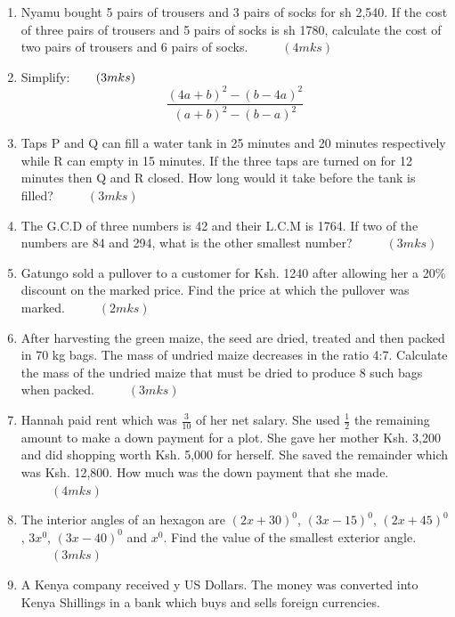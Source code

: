 \documentclass[
  a4paperpaper,
]{scrbook}
\begin{document}
\begin{tcolorbox}
\begin{enumerate}
\def\labelenumi{\arabic{enumi}.}
\setcounter{enumi}{1}
\item
  Nyamu bought 5 pairs of trousers and 3 pairs of socks for sh 2,540. If
  the cost of three pairs of trousers and 5 pairs of socks is sh 1780,
  calculate the cost of two pairs of trousers and 6 pairs of socks.
  \(\hspace{1cm} (4mks)\)
\item
  Simplify: \(\hspace{0.6cm} (3mks)\)
  \[ \frac{(4a+b)^2-(b-4a)^2}{(a+b)^2-(b-a)^2}\]
\item
  Taps P and Q can fill a water tank in 25 minutes and 20 minutes
  respectively while R can empty in 15 minutes. If the three taps are
  turned on for 12 minutes then Q and R closed. How long would it take
  before the tank is filled? \(\hspace{1cm} (3 mks)\)
\item
  The G.C.D of three numbers is 42 and their L.C.M is 1764. If two of
  the numbers are 84 and 294, what is the other smallest number?
  \(\hspace{1cm} (3 mks)\)
\item
  Gatungo sold a pullover to a customer for Ksh. 1240 after allowing her
  a 20\% discount on the marked price. Find the price at which the
  pullover was marked. \(\hspace{1cm}(2mks)\)
\item
  After harvesting the green maize, the seed are dried, treated and then
  packed in 70 kg bags. The mass of undried maize decreases in the ratio
  4:7. Calculate the mass of the undried maize that must be dried to
  produce 8 such bags when packed. \(\hspace{1cm}(3mks)\)
\item
  Hannah paid rent which was \(\frac{3}{10}\) of her net salary. She
  used \(\frac{1}{2}\) the remaining amount to make a down payment for a
  plot. She gave her mother Ksh. 3,200 and did shopping worth Ksh. 5,000
  for herself. She saved the remainder which was Ksh. 12,800. How much
  was the down payment that she made. \(\hspace{1cm} (4mks)\)
\item
  The interior angles of an hexagon are \((2x + 30)^0\),
  \((3x - 15)^0\), \((2x + 45)^0\), \(3x^0\), \((3x - 40)^0\) and
  \(x^0\). Find the value of the smallest exterior angle.
  \(\hspace{1cm} (3mks)\)
\item
  A Kenya company received y US Dollars. The money was converted into
  Kenya Shillings in a bank which buys and sells foreign currencies.
\end{enumerate}


\end{tcolorbox}
\end{document}

